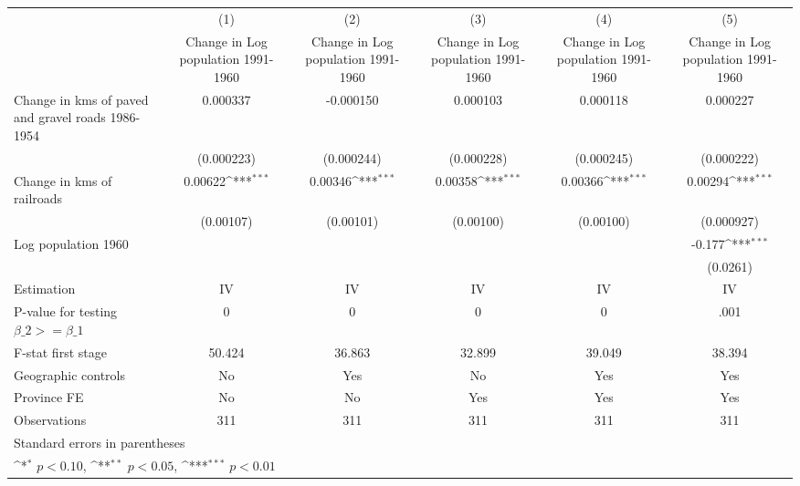 {
\def\sym#1{\ifmmode^{#1}\else\(^{#1}\)\fi}
\begin{tabular}{l*{5}{c}}
\hline\hline
                    &\multicolumn{1}{c}{(1)}&\multicolumn{1}{c}{(2)}&\multicolumn{1}{c}{(3)}&\multicolumn{1}{c}{(4)}&\multicolumn{1}{c}{(5)}\\
                    &\multicolumn{1}{c}{Change in Log population 1991-1960}&\multicolumn{1}{c}{Change in Log population 1991-1960}&\multicolumn{1}{c}{Change in Log population 1991-1960}&\multicolumn{1}{c}{Change in Log population 1991-1960}&\multicolumn{1}{c}{Change in Log population 1991-1960}\\
\hline
Change in kms of paved and gravel roads 1986-1954&    0.000337         &   -0.000150         &    0.000103         &    0.000118         &    0.000227         \\
                    &  (0.000223)         &  (0.000244)         &  (0.000228)         &  (0.000245)         &  (0.000222)         \\
[1em]
Change in kms of railroads&     0.00622\sym{***}&     0.00346\sym{***}&     0.00358\sym{***}&     0.00366\sym{***}&     0.00294\sym{***}\\
                    &   (0.00107)         &   (0.00101)         &   (0.00100)         &   (0.00100)         &  (0.000927)         \\
[1em]
Log population 1960 &                     &                     &                     &                     &      -0.177\sym{***}\\
                    &                     &                     &                     &                     &    (0.0261)         \\
\hline
Estimation          &          IV         &          IV         &          IV         &          IV         &          IV         \\
P-value for testing $\beta\_2 >= \beta\_1$&           0         &           0         &           0         &           0         &        .001         \\
F-stat first stage  &      50.424         &      36.863         &      32.899         &      39.049         &      38.394         \\
Geographic controls &          No         &         Yes         &          No         &         Yes         &         Yes         \\
Province FE         &          No         &          No         &         Yes         &         Yes         &         Yes         \\
Observations        &         311         &         311         &         311         &         311         &         311         \\
\hline\hline
\multicolumn{6}{l}{\footnotesize Standard errors in parentheses}\\
\multicolumn{6}{l}{\footnotesize \sym{*} \(p<0.10\), \sym{**} \(p<0.05\), \sym{***} \(p<0.01\)}\\
\end{tabular}
}
